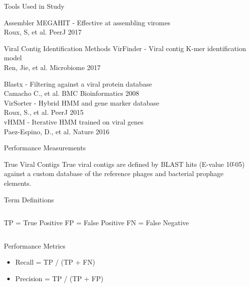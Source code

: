 \documentclass[11pt]{beamer}
\begin{document}
	\begin{frame}{Tools Used in Study}
	\begin{block}{Assembler}
	MEGAHIT - Effective at assembling viromes \\
	\tiny{Roux, S, et al. PeerJ 2017}
	\end{block}
	
	\begin{block}{Viral Contig Identification Methods}
	VirFinder - Viral contig K-mer identification model \\ 
	\tiny{Ren, Jie, et al. Microbiome 2017}
	
	\large{Blastx - Filtering against a viral protein database} \\
	\tiny{Camacho C., et al. BMC Bioinformatics 2008} \\
	
	\large{VirSorter - Hybrid HMM and gene marker database} \\
	\tiny{Roux, S., et al. PeerJ 2015} \\
	
	\large{vHMM - Iterative HMM trained on viral genes} \\
	\tiny{Paez-Espino, D., et al. Nature 2016} 
	
	\end{block}
	
	
	\end{frame}
	
	
	
	
	\begin{frame}{Performance Measurements}
	
	\begin{block}{True Viral Contigs}
	True viral contigs are defined by BLAST hits (E-value 10\^-05) against a custom database of the reference phages and bacterial prophage elements. 
	\end{block}
	
	\begin{block}{Term Definitions}
	\begin{columns}
	TP = True Positive
	FP = False Positive
	FN = False Negative
	\end{columns}
	
	\end{block}
	\vspace{-0.2cm}
	\begin{block}{Performance Metrics}
	\begin{itemize}
	\item Recall = TP / (TP + FN)
	\item Precision = TP / (TP + FP)
	\end{itemize}
	\end{block}
	\end{frame}
	
\end{document}
